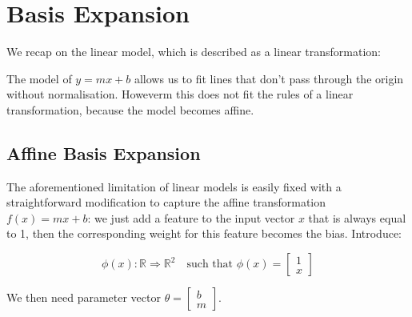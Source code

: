 \section{Basis Expansion}
We recap on the linear model, which is described as a linear transformation:


The model of $y=mx+b$ allows us to fit lines that don't pass through the origin without normalisation. Howeverm this does not fit the rules of a linear transformation, because the model becomes affine.


\subsection{Affine Basis Expansion}
The aforementioned limitation of linear models is easily fixed with a straightforward modification to capture the affine transformation $f(x) = mx + b$: we just add a feature to the input vector $x$ that is always equal to 1, then the corresponding weight for this feature becomes the bias. Introduce:

\begin{equation}
    \phi(x) : \mathbb{R} \Rightarrow \mathbb{R}^2 \quad \text{such that } \phi(x) = \begin{bmatrix} 1 \\ x \end{bmatrix}
\end{equation}

\noindent We then need parameter vector $\theta = \begin{bmatrix} b \\ m \end{bmatrix}$.

